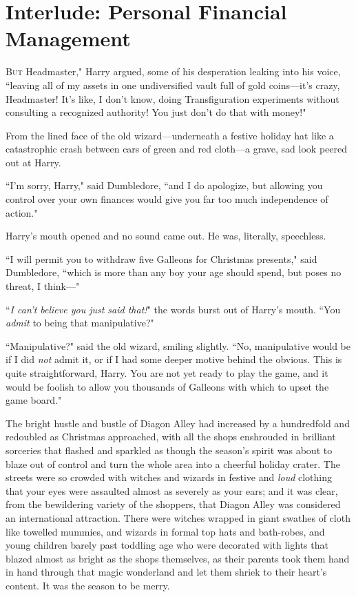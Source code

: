 \chapter{Interlude: Personal Financial Management}

\lettrine[ante=``]{B}{ut} Headmaster," Harry argued, some of his desperation leaking into his voice, ``leaving all of my assets in one undiversified vault full of gold coins—it's crazy, Headmaster! It's like, I don't know, doing Transfiguration experiments without consulting a recognized authority! You just don't do that with money!"

From the lined face of the old wizard—underneath a festive holiday hat like a catastrophic crash between cars of green and red cloth—a grave, sad look peered out at Harry.

``I'm sorry, Harry," said Dumbledore, ``and I do apologize, but allowing you control over your own finances would give you far too much independence of action."

Harry's mouth opened and no sound came out. He was, literally, speechless.

``I will permit you to withdraw five Galleons for Christmas presents," said Dumbledore, ``which is more than any boy your age should spend, but poses no threat, I think—"

``\emph{I can't believe you just said that!}" the words burst out of Harry's mouth. ``You \emph{admit} to being that manipulative?"

``Manipulative?" said the old wizard, smiling slightly. ``No, manipulative would be if I did \emph{not} admit it, or if I had some deeper motive behind the obvious. This is quite straightforward, Harry. You are not yet ready to play the game, and it would be foolish to allow you thousands of Galleons with which to upset the game board."

\later

The bright hustle and bustle of Diagon Alley had increased by a hundredfold and redoubled as Christmas approached, with all the shops enshrouded in brilliant sorceries that flashed and sparkled as though the season's spirit was about to blaze out of control and turn the whole area into a cheerful holiday crater. The streets were so crowded with witches and wizards in festive and \emph{loud} clothing that your eyes were assaulted almost as severely as your ears; and it was clear, from the bewildering variety of the shoppers, that Diagon Alley was considered an international attraction. There were witches wrapped in giant swathes of cloth like towelled mummies, and wizards in formal top hats and bath-robes, and young children barely past toddling age who were decorated with lights that blazed almost as bright as the shops themselves, as their parents took them hand in hand through that magic wonderland and let them shriek to their heart's content. It was the season to be merry.

